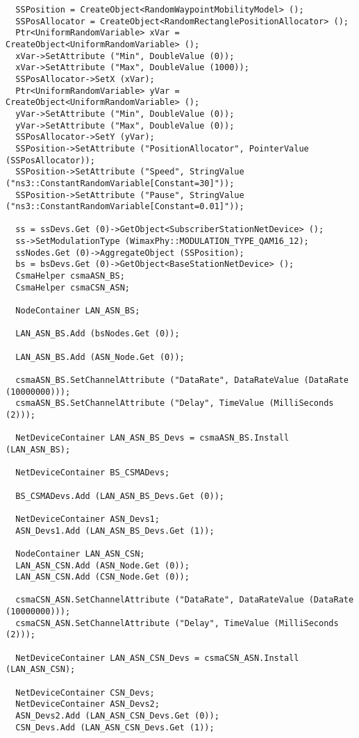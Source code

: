 \documentclass[14pt,a4paper]{article}
\begin{document}
{\begin{verbatim}
  SSPosition = CreateObject<RandomWaypointMobilityModel> ();
  SSPosAllocator = CreateObject<RandomRectanglePositionAllocator> ();
  Ptr<UniformRandomVariable> xVar = CreateObject<UniformRandomVariable> ();
  xVar->SetAttribute ("Min", DoubleValue (0));
  xVar->SetAttribute ("Max", DoubleValue (1000));
  SSPosAllocator->SetX (xVar);
  Ptr<UniformRandomVariable> yVar = CreateObject<UniformRandomVariable> ();
  yVar->SetAttribute ("Min", DoubleValue (0));
  yVar->SetAttribute ("Max", DoubleValue (0));
  SSPosAllocator->SetY (yVar);
  SSPosition->SetAttribute ("PositionAllocator", PointerValue (SSPosAllocator));
  SSPosition->SetAttribute ("Speed", StringValue ("ns3::ConstantRandomVariable[Constant=30]"));
  SSPosition->SetAttribute ("Pause", StringValue ("ns3::ConstantRandomVariable[Constant=0.01]"));

  ss = ssDevs.Get (0)->GetObject<SubscriberStationNetDevice> ();
  ss->SetModulationType (WimaxPhy::MODULATION_TYPE_QAM16_12);
  ssNodes.Get (0)->AggregateObject (SSPosition);
  bs = bsDevs.Get (0)->GetObject<BaseStationNetDevice> ();
  CsmaHelper csmaASN_BS;
  CsmaHelper csmaCSN_ASN;

  NodeContainer LAN_ASN_BS;

  LAN_ASN_BS.Add (bsNodes.Get (0));

  LAN_ASN_BS.Add (ASN_Node.Get (0));

  csmaASN_BS.SetChannelAttribute ("DataRate", DataRateValue (DataRate (10000000)));
  csmaASN_BS.SetChannelAttribute ("Delay", TimeValue (MilliSeconds (2)));

  NetDeviceContainer LAN_ASN_BS_Devs = csmaASN_BS.Install (LAN_ASN_BS);

  NetDeviceContainer BS_CSMADevs;

  BS_CSMADevs.Add (LAN_ASN_BS_Devs.Get (0));

  NetDeviceContainer ASN_Devs1;
  ASN_Devs1.Add (LAN_ASN_BS_Devs.Get (1));

  NodeContainer LAN_ASN_CSN;
  LAN_ASN_CSN.Add (ASN_Node.Get (0));
  LAN_ASN_CSN.Add (CSN_Node.Get (0));

  csmaCSN_ASN.SetChannelAttribute ("DataRate", DataRateValue (DataRate (10000000)));
  csmaCSN_ASN.SetChannelAttribute ("Delay", TimeValue (MilliSeconds (2)));

  NetDeviceContainer LAN_ASN_CSN_Devs = csmaCSN_ASN.Install (LAN_ASN_CSN);

  NetDeviceContainer CSN_Devs;
  NetDeviceContainer ASN_Devs2;
  ASN_Devs2.Add (LAN_ASN_CSN_Devs.Get (0));
  CSN_Devs.Add (LAN_ASN_CSN_Devs.Get (1));


\end{verbatim}}
\end{document}
